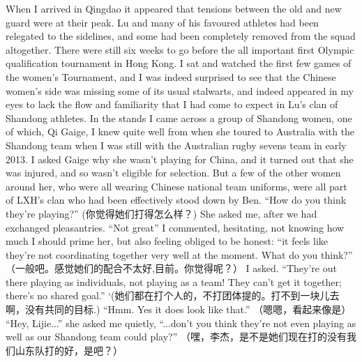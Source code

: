 \begin{CJK}{UTF8}{gbsn}

When I arrived in Qingdao it appeared that tensions between the old and new guard were at their peak.  Lu and many of his favoured athletes had been relegated to the sidelines, and some had been completely removed from the squad altogether.  There were still six weeks to go before the all important first Olympic qualification tournament in Hong Kong.  I sat and watched the first few games of the women's Tournament, and I was indeed surprised to see that the Chinese women's side was missing some of its usual stalwarts, and indeed appeared in my eyes to lack the flow and familiarity that I had come to expect in Lu's clan of Shandong athletes.  In the stands I came across a group of Shandong women, one of which, Qi Gaige, I knew quite well from when she toured to Australia with the Shandong team when I was still with the Australian rugby sevens team in early 2013.  I asked Gaige why she wasn't playing for China, and it turned out that she was injured, and so wasn't eligible for selection.  But a few of the other women around her, who were all wearing Chinese national team uniforms, were all part of LXH's clan who had been effectively stood down by Ben. ``How do you think they're playing?'' (你觉得她们打得怎么样？) She asked me, after we had exchanged pleasantries. ``Not great'' I commented, hesitating, not knowing how much I should prime her, but also feeling obliged to be honest: ``it feels like they’re not coordinating together very well at the moment.  What do you think?'' （一般吧。感觉她们的配合不太好,目前。你觉得呢？） I asked.  ``They’re out there playing as individuals, not playing as a team! They can't get it together; there's no shared goal.'' `(她们都在打个人的，不打团体提的。打不到一块儿去啊，没有共同的目标.)  ``Hmm. Yes it does look like that.'' （嗯嗯，看起来像是） ``Hey, Lijie...'' she asked me quietly, ``...don’t you think they’re not even playing as well as our Shandong team could play?'' （嘿，李杰，是不是她们现在打的没有我们山东队打的好，是吧？）


\end{CJK}
